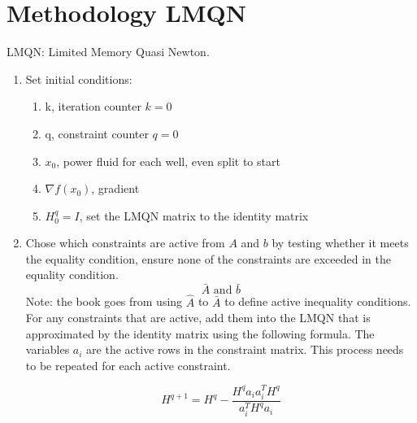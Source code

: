 \documentclass{article}
\begin{document}
\section{Methodology LMQN}

LMQN: Limited Memory Quasi Newton.

\begin{enumerate}
    \item Set initial conditions:
    \begin{enumerate}
        \item k, iteration counter $k=0$
        \item q, constraint counter $q=0$
        \item $x_{0}$, power fluid for each well, even split to start
        \item $\nabla f(x_{0})$, gradient
        \item $H_{0}^q = I$, set the LMQN matrix to the identity matrix
    \end{enumerate}
    
    \item Chose which constraints are active from $A$ and $b$ by testing whether it meets the equality condition, ensure none of the constraints are exceeded in the equality condition. 
    $$\bar{A} \text{ and } \bar{b}$$ 
    Note: the book goes from using $\hat{A}$ to $\bar{A}$ to define active inequality conditions. \\
    
    For any constraints that are active, add them into the LMQN that is approximated by the identity matrix using the following formula. The variables $a_{i}$ are the active rows in the constraint matrix. This process needs to be repeated for each active constraint.

    \begin{equation*}
        H^{q+1} = H^q - \dfrac{H^q a_{i} a_i^T H^q}{a_i^T H^q a_i}
    \end{equation*}
    

\end{enumerate}
\end{document}
